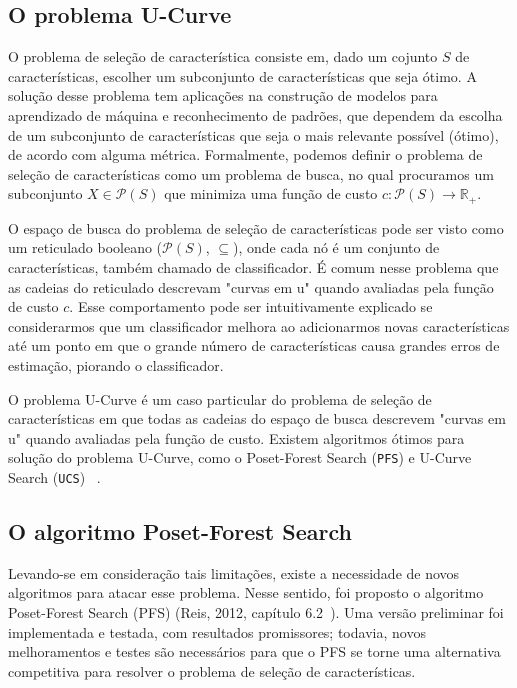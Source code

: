 \documentclass[12pt]{article}
\begin{document}
\subsection{O problema U-Curve}
O problema de seleção de característica consiste em, dado um cojunto $S$
de características, escolher um subconjunto de características que seja
ótimo. A solução desse problema tem aplicações na construção de modelos
para aprendizado de máquina e reconhecimento de padrões, que dependem da
escolha de um subconjunto de características que seja o mais relevante 
possível (ótimo), de acordo com alguma métrica. Formalmente, podemos 
definir o problema de seleção de características como um problema de 
busca, no qual procuramos um subconjunto $X \in \mathcal{P}(S)$ que 
minimiza uma função de custo $c : \mathcal{P}(S) \to \mathbb{R_+}$.

O espaço de busca do problema de seleção de características pode ser
visto como um reticulado booleano ($\mathcal{P}(S)$, $\subseteq$), onde
cada nó é um conjunto de características, também chamado de 
classificador. É comum nesse problema que as cadeias do reticulado
descrevam "curvas em u" quando avaliadas pela  função de custo $c$. Esse
comportamento pode ser intuitivamente explicado se considerarmos que um 
classificador melhora ao adicionarmos novas características até um ponto
em que o grande número de características causa grandes erros de 
estimação, piorando o classificador. 

O problema U-Curve é um caso particular do problema de seleção de
características em que todas as cadeias do espaço de busca descrevem
"curvas em u" quando avaliadas pela função de custo. Existem algoritmos
ótimos para solução do problema U-Curve, como o Poset-Forest Search
({\tt PFS}) e U-Curve Search ({\tt UCS}) ~\cite{msreis thesis}.

\subsection{O algoritmo Poset-Forest Search}

Levando-se em consideração tais limitações, existe a necessidade de
novos algoritmos para atacar esse problema. Nesse sentido, foi proposto o 
algoritmo Poset-Forest Search (PFS) (Reis, 2012, capítulo 6.2~\cite{msreis thesis}). Uma versão
preliminar foi implementada e testada, com resultados promissores; todavia,
novos melhoramentos e testes são necessários para que o PFS se torne uma 
alternativa competitiva para resolver o problema de seleção de características.
\end{document}
